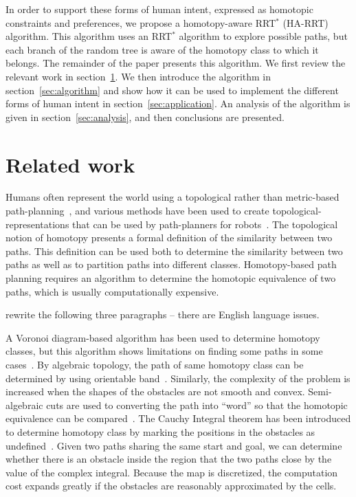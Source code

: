 \documentclass[letterpaper, 10 pt, conference]{ieeeconf}
\begin{document}
In order to support these forms of human intent, expressed as homotopic constraints and preferences, we propose a homotopy-aware RRT$^{*}$ (HA-RRT) algorithm.  This algorithm uses an RRT$^*$ algorithm to explore possible paths, but each branch of the random tree is aware of the homotopy class to which it belongs.  The remainder of the paper presents this algorithm. We first review the relevant work in section~\ref{sec:related_work}.
We then introduce the algorithm in section~\ref{sec:algorithm} and show how it can be used to implement the different forms of human intent in section~\ref{sec:application}. An analysis of the algorithm is given in section~\ref{sec:analysis}, and then conclusions are presented.

\section{Related work}
\label{sec:related_work}

Humans often represent the world using a topological rather than metric-based path-planning~\cite{kuipers99,aginsky1997two}, and various methods have been used to create topological-representations that can be used by path-planners for robots~\cite{mataric1992integration,thrun1998learning,fasola2013modeling,shah2013qualitative}.  
The topological notion of homotopy presents a formal definition of the similarity between two paths.
This definition can be used both to determine the similarity between two paths as well as to partition paths into different classes.
Homotopy-based path planning requires an algorithm to determine the homotopic equivalence of two paths, which is usually computationally expensive.

{\sc rewrite the following three paragraphs -- there are English language issues.}

A Voronoi diagram-based algorithm has been used to determine homotopy classes, but this algorithm shows limitations on finding some paths in some cases~\cite{banerjee2013framework}.
By algebraic topology, the path of same homotopy class can be determined by using orientable band~\cite{Hershberger199463}.
Similarly, the complexity of the problem is increased when the shapes of the obstacles are not smooth and convex.
Semi-algebraic cuts are used to converting the path into ``word'' so that the homotopic equivalence can be compared~\cite{Grigoriev:1998:PAS:281508.281528}.
The Cauchy Integral theorem has been introduced to determine homotopy class by marking the positions in the obstacles as undefined~\cite{AAAI101920}.
Given two paths sharing the same start and goal, we can determine whether there is an obstacle inside the region that the two paths close by the value of the complex integral.
Because the map is discretized, the computation cost expands greatly if the obstacles are reasonably approximated by the cells.
\end{document}
